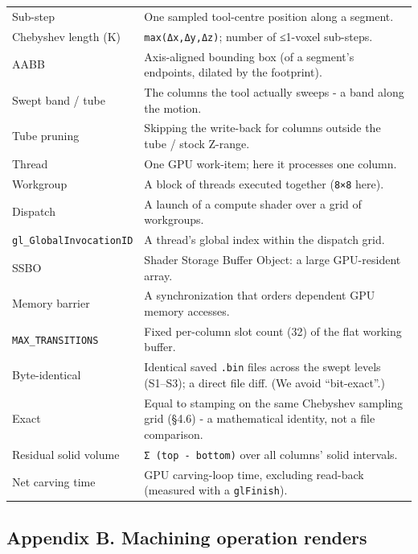\documentclass[
]{article}
\begin{document}
\begin{longtable}[]{@{}
  >{\raggedright\arraybackslash}p{}
  >{\raggedright\arraybackslash}p{}@{}}
Sub-step & One sampled tool-centre position along a segment. \\
Chebyshev length (K) &
\texttt{max(\textbar{}Δx\textbar{},\textbar{}Δy\textbar{},\textbar{}Δz\textbar{})};
number of ≤1-voxel sub-steps. \\
AABB & Axis-aligned bounding box (of a segment's endpoints, dilated by
the footprint). \\
Swept band / tube & The columns the tool actually sweeps - a band along
the motion. \\
Tube pruning & Skipping the write-back for columns outside the tube /
stock Z-range. \\
Thread & One GPU work-item; here it processes one column. \\
Workgroup & A block of threads executed together (\texttt{8×8} here). \\
Dispatch & A launch of a compute shader over a grid of workgroups. \\
\texttt{gl\_\allowbreak GlobalInvocationID} & A thread's global index within the
dispatch grid. \\
SSBO & Shader Storage Buffer Object: a large GPU-resident array. \\
Memory barrier & A synchronization that orders dependent GPU memory
accesses. \\
\texttt{MAX\_TRANSITIONS} & Fixed per-column slot count (32) of the flat
working buffer. \\
Byte-identical & Identical saved \texttt{.bin} files across the swept
levels (S1--S3); a direct file diff. (We avoid ``bit-exact''.) \\
Exact & Equal to stamping on the same Chebyshev sampling grid (§4.6) - a
mathematical identity, not a file comparison. \\
Residual solid volume & \texttt{Σ\ (top\ -\ bottom)} over all columns'
solid intervals. \\
Net carving time & GPU carving-loop time, excluding read-back (measured
with a \texttt{glFinish}). \\
\end{longtable}

\hypertarget{section}{%
\subsection{\texorpdfstring{\hfill\break
}{ }}\label{section}}

\hypertarget{appendix-b.-machining-operation-renders}{%
\subsection{Appendix B. Machining operation
renders}\label{appendix-b.-machining-operation-renders}}
\end{document}

